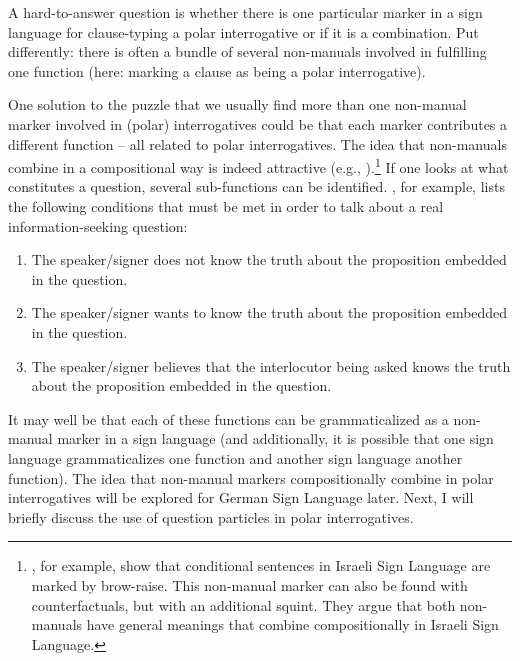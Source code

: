 A hard-to-answer question is whether there is one particular marker in a sign language for clause-typing a polar interrogative or if it is a combination. Put differently: there is often a bundle of several non-manuals involved in fulfilling one function (here: marking a clause as being a polar interrogative).

One solution to the puzzle that we usually find more than one non-manual marker involved in (polar) interrogatives could be that each marker contributes a different function -- all related to polar interrogatives. The idea that non-manuals combine in a compositional way is indeed attractive (e.g., \citealt{nespor1999prosody, sandler2006sign, dachkovsky2009visual, herrmann2013modal}).\footnote{ \citet{dachkovsky2009visual}, for example, show that conditional sentences in Israeli Sign Language are marked by brow-raise. This non-manual marker can also be found with counterfactuals, but with an additional squint. They argue that both non-manuals have general meanings that combine compositionally in Israeli Sign Language.} If one looks at what constitutes a question, several sub-functions can be identified. \citet[4]{dayal2016questions}, for example, lists the following conditions that must be met in order to talk about a real information-seeking question:

\begin{enumerate}[itemsep=0pt]
	\item The speaker/signer does not know the truth about the proposition embedded in the question.
	\item The speaker/signer wants to know the truth about the proposition embedded in the question.
	\item The speaker/signer believes that the interlocutor being asked knows the truth about the proposition embedded in the question.
\end{enumerate}


\noindent It may well be that each of these functions can be grammaticalized as a non-manual marker in a sign language (and additionally, it is possible that one sign language grammaticalizes one function and another sign language another function). The idea that non-manual markers compositionally combine in polar interrogatives will be explored for German Sign Language later. Next, I will briefly discuss the use of question particles in polar interrogatives.


